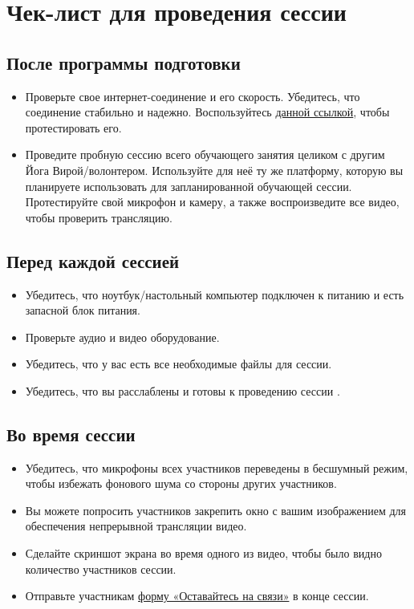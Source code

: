 \newpage
\section*{Чек-лист для проведения сессии}
\label{sec:check}

\subsection*{После программы подготовки}
\begin{itemize}
\item Проверьте свое интернет-соединение и его скорость. Убедитесь, что соединение стабильно и надежно. Воспользуйтесь \href{https://www.speedtest.net}{данной ссылкой}, чтобы протестировать его.

\item Проведите пробную сессию всего обучающего занятия целиком с другим Йога Вирой/волонтером. Используйте для неё ту же платформу, которую вы планируете использовать для запланированной обучающей сессии. Протестируйте свой микрофон и камеру, а также воспроизведите все видео, чтобы проверить трансляцию.

\end{itemize}

\subsection*{Перед каждой сессией}
\begin{itemize}
\item Убедитесь, что ноутбук/настольный компьютер подключен к питанию и есть запасной блок питания.
\item Проверьте аудио и видео оборудование.
\item Убедитесь, что у вас есть все необходимые файлы для сессии.
\item Убедитесь, что вы расслаблены и готовы к проведению сессии \faSmileO.
\end{itemize}
\subsection*{Во время сессии}
\begin{itemize}
\item Убедитесь, что микрофоны всех участников переведены в бесшумный режим, чтобы избежать фонового шума со стороны других участников.

\item Вы можете попросить участников закрепить окно с вашим изображением для обеспечения непрерывной трансляции видео.

\item Сделайте скриншот экрана во время одного из видео, чтобы было видно количество участников сессии.

\item Отправьте участникам \href{https://forms.gle/oxQNwrThpZ5bxwFm8}{форму «Оставайтесь на связи»} в конце сессии. 
\end{itemize}

